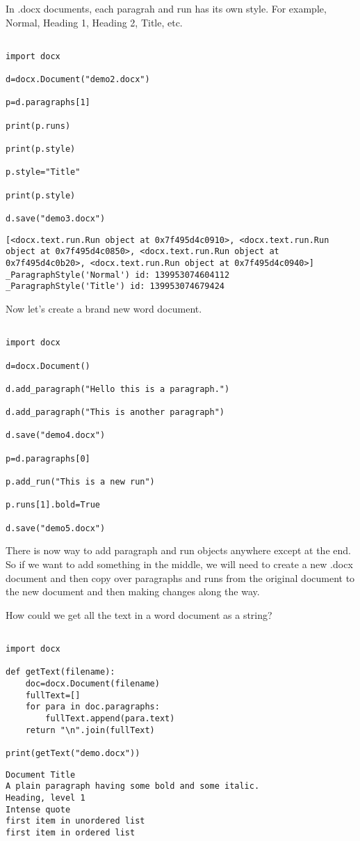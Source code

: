 \documentclass[11pt]{article}
\begin{document}
In .docx documents, each paragrah and run has its own style. For example, Normal, Heading 1, Heading 2, Title, etc.

\begin{verbatim}

import docx

d=docx.Document("demo2.docx")

p=d.paragraphs[1]

print(p.runs)

print(p.style)

p.style="Title"

print(p.style)

d.save("demo3.docx")

\end{verbatim}

\begin{verbatim}
[<docx.text.run.Run object at 0x7f495d4c0910>, <docx.text.run.Run object at 0x7f495d4c0850>, <docx.text.run.Run object at 0x7f495d4c0b20>, <docx.text.run.Run object at 0x7f495d4c0940>]
_ParagraphStyle('Normal') id: 139953074604112
_ParagraphStyle('Title') id: 139953074679424
\end{verbatim}


Now let's create a brand new word document.

\begin{verbatim}

import docx

d=docx.Document()

d.add_paragraph("Hello this is a paragraph.")

d.add_paragraph("This is another paragraph")

d.save("demo4.docx")

p=d.paragraphs[0]

p.add_run("This is a new run")

p.runs[1].bold=True

d.save("demo5.docx")

\end{verbatim}

There is now way to add paragraph and run objects anywhere except at the end. So if we want to add something in the middle, we will need to create a new .docx document and then copy over paragraphs and runs from the original document to the new document and then making changes along the way.

How could we get all the text in a word document as a string?

\begin{verbatim}

import docx

def getText(filename):
    doc=docx.Document(filename)
    fullText=[]
    for para in doc.paragraphs:
        fullText.append(para.text)
    return "\n".join(fullText)

print(getText("demo.docx"))

\end{verbatim}

\begin{verbatim}
Document Title
A plain paragraph having some bold and some italic.
Heading, level 1
Intense quote
first item in unordered list
first item in ordered list


\end{verbatim}
\end{document}
